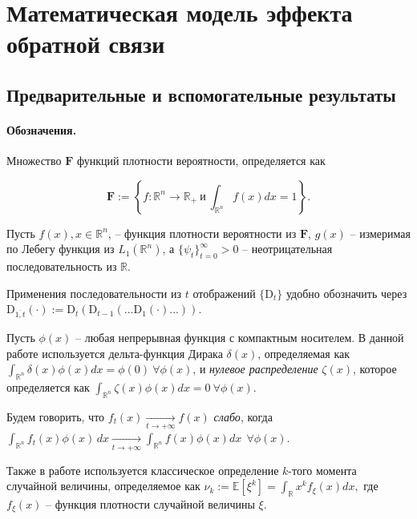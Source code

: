 \section{Математическая модель эффекта обратной связи}
\label{sec:mainres}
    \subsection{Предварительные и вспомогательные результаты}
    \paragraph{Обозначения.}
        Множество $\textbf{F}$ функций плотности вероятности, определяется как

        \begin{equation} \label{R}
            \textbf{F} := \left\{f : \mathbb{R}^n \rightarrow \mathbb{R}_+ ~\text{и}~ \int_{\mathbb{R}^n}f(x)dx = 1\right\}.
        \end{equation}
        
        Пусть $f(x), x \in \mathbb{R}^n$, -- функция плотности вероятности из $\textbf{F}$, $g(x)$ -- измеримая по Лебегу функция из $L_1(\mathbb{R}^n)$, а $\{\psi_t\}_{t = 0}^{\infty} > 0$ -- неотрицательная последовательность из $\mathbb{R}$. 

        Применения последовательности из $t$ отображений $\{\text{D}_t\}$ удобно обозначить через $\text{D}_{\overline{1, t}}(\cdot) := \text{D}_t(\text{D}_{t-1} ( ... \text{D}_1( \cdot ) ... ))$.

        Пусть $\phi(x)$ -- любая непрерывная функция с компактным носителем. В данной работе используется дельта-функция Дирака $\delta(x)$, определяемая как 
        $
           \int_{\mathbb{R}^n} \delta(x) \phi(x) dx =  \phi(0) ~ \forall \phi(x)
        $, и \emph{нулевое распределение} $\zeta(x)$, которое определяется как
        $
        \int_{\mathbb{R}^n} \zeta(x) \phi(x) dx =  0 ~ \forall \phi(x).
        $

        Будем говорить, что $f_t(x) \underset{t \to +\infty}{\longrightarrow} f(x)$ \emph{слабо}, когда 
        $
            \int_{\mathbb{R}^n} f_t(x) \phi(x) \, dx \underset{t \to +\infty}{\longrightarrow} \int_{\mathbb{R}^n} f(x) \phi(x) dx ~~ \forall \phi(x).
        $

        Также в работе используется классическое определение $k$-того момента случайной величины, определяемое как 
        $
        \nu_{k} := \mathbb{E}[\xi^k] = \int_{\mathbb{R}} x^{k} f_{\xi}(x) dx,
        $
        где $f_{\xi}(x)$ -- функция плотности случайной величины $\xi$.

